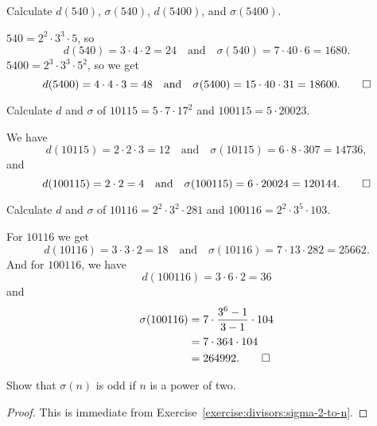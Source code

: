  Calculate $d(540)$, $\sigma(540)$, $d(5400)$, and
$\sigma(5400)$.
\begin{solution}
  $540 = 2^2\cdot3^3\cdot5$, so
  \begin{equation*}
    d(540) = 3\cdot4\cdot2 = 24
    \quad\text{and}\quad
    \sigma(540) = 7\cdot40\cdot6 = 1680.
  \end{equation*}
  $5400 = 2^3\cdot3^3\cdot5^2$, so we get
  \begin{equation*}
    d(5400) = 4\cdot4\cdot3 = 48
    \quad\text{and}\quad
    \sigma(5400) = 15\cdot40\cdot31 = 18600. \qedhere
  \end{equation*}
\end{solution}

 Calculate $d$ and $\sigma$ of $10115 = 5\cdot7\cdot17^2$ and
$100115 = 5\cdot20023$.
\begin{solution}
  We have
  \begin{equation*}
    d(10115) = 2\cdot2\cdot3 = 12
    \quad\text{and}\quad
    \sigma(10115) = 6\cdot8\cdot307 = 14736,
  \end{equation*}
  and
  \begin{equation*}
    d(100115) = 2\cdot2 = 4
    \quad\text{and}\quad
    \sigma(100115) = 6\cdot20024 = 120144. \qedhere
  \end{equation*}
\end{solution}

 Calculate $d$ and $\sigma$ of $10116 = 2^2\cdot3^2\cdot281$
and $100116 = 2^2\cdot3^5\cdot103$.
\begin{solution}
  For $10116$ we get
  \begin{equation*}
    d(10116) = 3\cdot3\cdot2 = 18
    \quad\text{and}\quad
    \sigma(10116) = 7\cdot13\cdot282 = 25662.
  \end{equation*}
  And for $100116$, we have
  \begin{equation*}
    d(100116) = 3\cdot6\cdot2 = 36
  \end{equation*}
  and
  \begin{align*}
    \sigma(100116) &= 7\cdot\frac{3^6 - 1}{3 - 1}\cdot104 \\
                   &= 7\cdot364\cdot104 \\
                   &= 264992. \qedhere
  \end{align*}
\end{solution}

 Show that $\sigma(n)$ is odd if $n$ is a power of two.
\begin{proof}
  This is immediate from
  Exercise~\ref{exercise:divisors:sigma-2-to-n}.
\end{proof}

